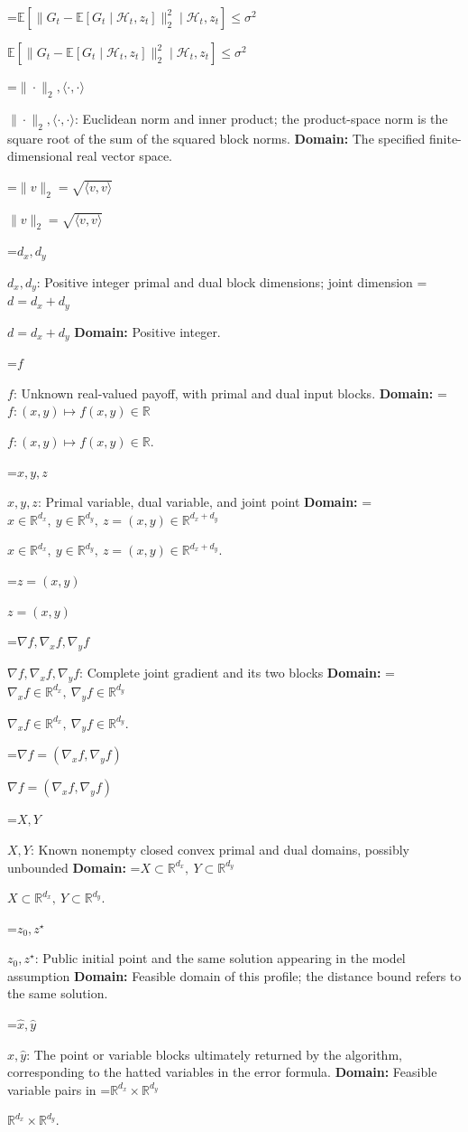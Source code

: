 \documentclass[10pt,a4paper]{article}
\newcommand{\AtlasMath}[1]{\par\begingroup\centering\setbox0=\hbox{$\displaystyle #1$}\ifdim\wd0>1.4\linewidth\typeout{ATLAS WIDE FORMULA: \the\wd0}\fi\ifdim\wd0>\linewidth\resizebox{\linewidth}{!}{\box0}\else\box0\fi\par\endgroup}
\newcommand{\AtlasInlineMath}[1]{\begingroup\setbox0=\hbox{$#1$}\ifdim\wd0>.4\linewidth\endgroup\AtlasMath{#1}\else\endgroup$#1$\fi}
\begin{document}
\AtlasInlineMath{\mathbb E[\|G_t-\mathbb E[G_t\mid\mathcal H_t,z_t]\|_2^2\mid\mathcal H_t,z_t]\le\sigma^2}



\AtlasInlineMath{\|\cdot\|_2,\langle\cdot,\cdot\rangle}: Euclidean norm and inner product; the product-space norm is the square root of the sum of the squared block norms. \textbf{Domain:} The specified finite-dimensional real vector space.



\AtlasInlineMath{\|v\|_2=\sqrt{\langle v,v\rangle}}



\AtlasInlineMath{d_x,d_y}: Positive integer primal and dual block dimensions; joint dimension \AtlasInlineMath{d=d_x+d_y} \textbf{Domain:} Positive integer.



\AtlasInlineMath{f}: Unknown real-valued payoff, with primal and dual input blocks. \textbf{Domain:} \AtlasInlineMath{f:(x,y)\mapsto f(x,y)\in\mathbb R}.



\AtlasInlineMath{x,y,z}: Primal variable, dual variable, and joint point \textbf{Domain:} \AtlasInlineMath{x\in\mathbb R^{d_x},\ y\in\mathbb R^{d_y},\ z=(x,y)\in\mathbb R^{d_x+d_y}}.



\AtlasInlineMath{z=(x,y)}



\AtlasInlineMath{\nabla f,\nabla_x f,\nabla_y f}: Complete joint gradient and its two blocks \textbf{Domain:} \AtlasInlineMath{\nabla_x f\in\mathbb R^{d_x},\ \nabla_y f\in\mathbb R^{d_y}}.



\AtlasInlineMath{\nabla f=(\nabla_x f,\nabla_y f)}



\AtlasInlineMath{X,Y}: Known nonempty closed convex primal and dual domains, possibly unbounded \textbf{Domain:} \AtlasInlineMath{X\subset\mathbb R^{d_x},\ Y\subset\mathbb R^{d_y}}.



\AtlasInlineMath{z_0,z^\star}: Public initial point and the same solution appearing in the model assumption \textbf{Domain:} Feasible domain of this profile; the distance bound refers to the same solution.



\AtlasInlineMath{\widehat x,\widehat y}: The point or variable blocks ultimately returned by the algorithm, corresponding to the hatted variables in the error formula. \textbf{Domain:} Feasible variable pairs in \AtlasInlineMath{\mathbb R^{d_x}\times\mathbb R^{d_y}}.
\end{document}
